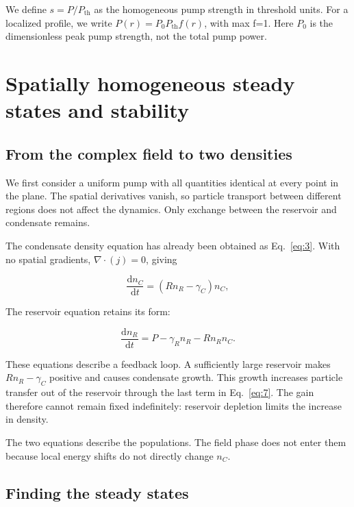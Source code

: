 \documentclass[12pt,a4paper]{article}
\begin{document}
We define $s=P/P_{\mathrm{th}}$ as the homogeneous pump strength in threshold units. For a localized profile, we write $P(r)=P_{0} P_{\mathrm{th}} f(r)$, with max f=1. Here $P_{0}$ is the dimensionless peak pump strength, not the total pump power.

\clearpage

\section{Spatially homogeneous steady states and stability}\label{sec:3}

\subsection{From the complex field to two densities}\label{sec:3.1}

We first consider a uniform pump with all quantities identical at every point in the plane. The spatial derivatives vanish, so particle transport between different regions does not affect the dynamics. Only exchange between the reservoir and condensate remains.

The condensate density equation has already been obtained as Eq.~\eqref{eq:3}. With no spatial gradients, $\nabla\!\cdot(j)=0$, giving

\begin{equation}\label{eq:6}
\frac{\mathrm dn_C}{\mathrm dt}=(Rn_R-\gamma_C)n_C,\end{equation}

The reservoir equation retains its form:

\begin{equation}\label{eq:7}
\frac{\mathrm dn_R}{\mathrm dt}=P-\gamma_R n_R-Rn_Rn_C.\end{equation}

These equations describe a feedback loop. A sufficiently large reservoir makes $R n_{R}-\gamma_{C}$ positive and causes condensate growth. This growth increases particle transfer out of the reservoir through the last term in Eq.~\eqref{eq:7}. The gain therefore cannot remain fixed indefinitely: reservoir depletion limits the increase in density.

The two equations describe the populations. The field phase does not enter them because local energy shifts do not directly change $n_{C}$.

\subsection{Finding the steady states}\label{sec:3.2}
\end{document}
